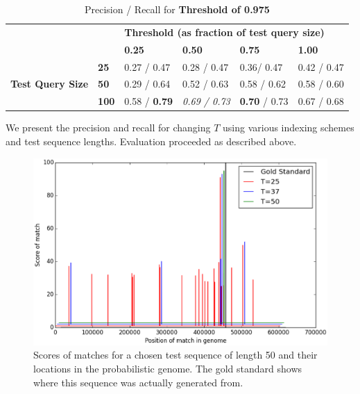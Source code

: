 \documentclass[11pt]{IEEEtran}
\begin{document}
\begin{table}[]
\centering
\caption{Precision / Recall for \textbf{Threshold of 0.975}}
\label{t975}
\begin{tabular}{ll|llll}
\cline{3-6}
                                                       &              & \multicolumn{4}{l|}{\textbf{Threshold (as fraction of test query size)}}                                                                          \\ \cline{3-6} 
\textbf{}                                              &              & \multicolumn{1}{l|}{\textbf{0.25}} & \multicolumn{1}{l|}{\textbf{0.50}} & \multicolumn{1}{l|}{\textbf{0.75}} & \multicolumn{1}{l|}{\textbf{1.00}} \\ \hline
\multicolumn{1}{|l|}{\multirow{3}{*}{\textbf{Test Query Size}}} & \textbf{25}  & 0.27 / 0.47                        & 0.28 / 0.47                         & 0.36/ 0.47                       & 0.42 / 0.47                      \\ \cline{2-2}
\multicolumn{1}{|l|}{}                                 & \textbf{50}  & 0.29 / 0.64                        & 0.52 / 0.63                         & 0.58 / 0.62                         & 0.58 / 0.60                        \\ \cline{2-2}
\multicolumn{1}{|l|}{}                                 & \textbf{100} & 0.58 / \textbf{0.79}                          & \emph{0.69 / 0.73}                    & \textbf{0.70} / 0.73                         & 0.67 / 0.68                        \\ \cline{1-2}
\end{tabular}
\end{table}

We present the precision and recall for changing $T$ using various indexing schemes and test sequence lengths. Evaluation proceeded as described above.

\begin{figure}
    \centering
    \includegraphics[scale=0.4]{dists}
    \caption{Scores of matches for a chosen test sequence of length 50 and their locations in the probabilistic genome. The gold standard shows where this sequence was actually generated from.}
    \label{dists}
\end{figure}
\end{document}
